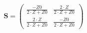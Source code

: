 \begin{equation} \mathbf{S} = \left(\begin{array}{cc}
\frac{-Z0}{2\cdot Z +Z0} & \frac{2\cdot Z}{2\cdot Z +Z0} \\
\frac{2\cdot Z}{2\cdot Z +Z0} & \frac{-Z0}{2\cdot Z +Z0}
\end{array}\right) \end{equation}
